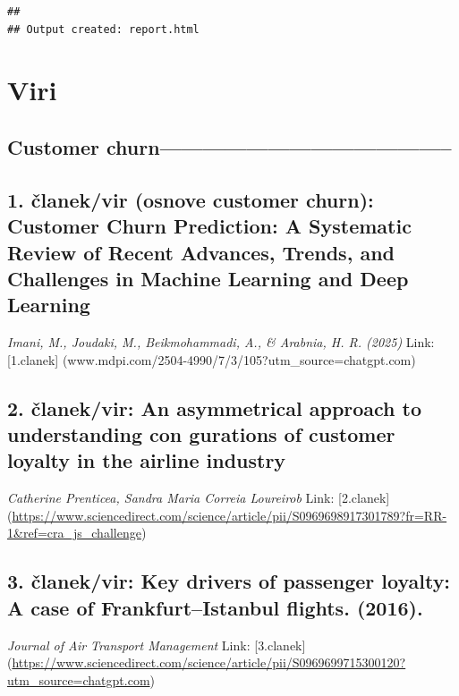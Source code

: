 \documentclass[
]{article}
\begin{document}
\begin{verbatim}
## 
## Output created: report.html
\end{verbatim}

\section{Viri}\label{viri}

\subsection{Customer
churn-----------------------------------------}\label{customer-churn}

\subsection{1. članek/vir (osnove customer churn): Customer Churn
Prediction: A Systematic Review of Recent Advances, Trends, and
Challenges in Machine Learning and Deep
Learning}\label{ux10dlanekvir-osnove-customer-churn-customer-churn-prediction-a-systematic-review-of-recent-advances-trends-and-challenges-in-machine-learning-and-deep-learning}

\emph{Imani, M., Joudaki, M., Beikmohammadi, A., \& Arabnia, H. R.
(2025)} Link: {[}1.clanek{]}
(www.mdpi.com/2504-4990/7/3/105?utm\_source=chatgpt.com)

\subsection{2. članek/vir: An asymmetrical approach to understanding con
gurations of customer loyalty in the airline
industry}\label{ux10dlanekvir-an-asymmetrical-approach-to-understanding-con-gurations-of-customer-loyalty-in-the-airline-industry}

\emph{Catherine Prenticea, Sandra Maria Correia Loureirob} Link:
{[}2.clanek{]}
(\url{https://www.sciencedirect.com/science/article/pii/S0969698917301789?fr=RR-1&ref=cra_js_challenge})

\subsection{3. članek/vir: Key drivers of passenger loyalty: A case of
Frankfurt--Istanbul flights.
(2016).}\label{ux10dlanekvir-key-drivers-of-passenger-loyalty-a-case-of-frankfurtistanbul-flights.-2016.}

\emph{Journal of Air Transport Management} Link: {[}3.clanek{]}
(\url{https://www.sciencedirect.com/science/article/pii/S0969699715300120?utm_source=chatgpt.com})
\end{document}
